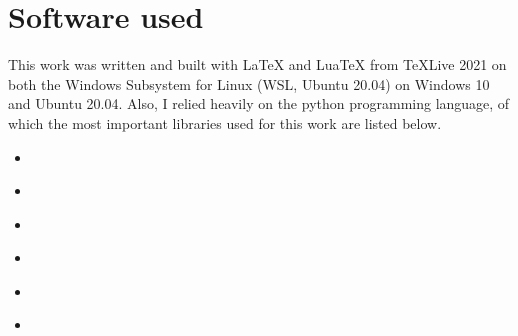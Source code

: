\begin{table}
    \centering
    \caption{Hyperparameters for the cleaning algorithms used in the grid search. The picture quantiles
    determine what percent of all pixels per event will be below the core threshold \(Q_c\).
    The boundary threshold is calculated by multiplying the core threshold by the boundary threshold ratio.
    The time limit \(t\) is the parameter for \fact, while the time limits \(t_c\) and \(t_b\) are
    the time limits for \tcc.}
    \label{tab:hyperparameters_gridsearch}
\end{table}



\section{Software used}

This work was written and built with \LaTeX{} and Lua\TeX{} from \TeX Live 2021 on both the Windows Subsystem for Linux (WSL, Ubuntu 20.04) on Windows 10 and Ubuntu 20.04.
Also, I relied heavily on the python programming language, of which the most important libraries used
for this work are listed below.
\begin{itemize}
    \item \numpy{}~\cite{numpy}
    \item \pandas{}~\cite{pandas}
    \item \matplotlib{}~\cite{matplotlib}
    \item \astropy{}~\cite{astropy1, astropy2}
    \item \pyirf{}~\cite{pyirf}
    \item \sklearn{}~\cite{scikit-learn}
\end{itemize}


